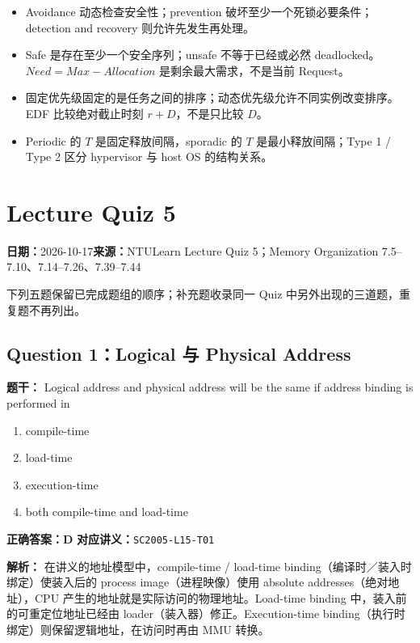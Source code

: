\documentclass[11pt,a4paper,fontset=fandol]{ctexart}
\renewcommand{\exercisequestion}[2]{%
  \Needspace{5\baselineskip}%
  \subsection{#2}\label{exercise:#1}%
}
\renewcommand{\exercisemeta}[5]{%
  {\small\textbf{日期：}#2\quad\textbf{来源：}#3\par}%
}
\renewenvironment{checkedsolution}
  {\par\nopagebreak[4]\textbf{解析：}\ignorespaces}
  {\par}
\begin{document}
\begin{itemize}
  \item Avoidance 动态检查安全性；prevention 破坏至少一个死锁必要条件；detection and recovery 则允许先发生再处理。
  \item Safe 是存在至少一个安全序列；unsafe 不等于已经或必然 deadlocked。$Need=Max-Allocation$ 是剩余最大需求，不是当前 Request。
  \item 固定优先级固定的是任务之间的排序；动态优先级允许不同实例改变排序。EDF 比较绝对截止时刻 $r+D$，不是只比较 $D$。
  \item Periodic 的 $T$ 是固定释放间隔，sporadic 的 $T$ 是最小释放间隔；Type 1 / Type 2 区分 hypervisor 与 host OS 的结构关系。
\end{itemize}

\section{Lecture Quiz 5}
\label{homework:SC2005-HW05}

\exercisemeta
  {SC2005-HW05}
  {2026-10-17}
  {NTULearn Lecture Quiz 5；Memory Organization 7.5--7.10、7.14--7.26、7.39--7.44}
  {五道主问题已完成并根据平台反馈核对；三道补充题按讲义核对}
  {是（2026-10-17）}

下列五题保留已完成题组的顺序；补充题收录同一 Quiz 中另外出现的三道题，重复题不再列出。

\exercisequestion{SC2005-HW05-Q01}{Question 1：Logical 与 Physical Address}

\textbf{题干：} Logical address and physical address will be the same if address binding is performed in

\begin{enumerate}[label=\Alph*.,leftmargin=2.4em]
  \item compile-time
  \item load-time
  \item execution-time
  \item both compile-time and load-time
\end{enumerate}

\textbf{正确答案：D}\qquad
\textbf{对应讲义：}\texttt{SC2005-L15-T01}

\begin{checkedsolution}
在讲义的地址模型中，compile-time / load-time binding（编译时／装入时绑定）使装入后的 process image（进程映像）使用 absolute addresses（绝对地址），CPU 产生的地址就是实际访问的物理地址。Load-time binding 中，装入前的可重定位地址已经由 loader（装入器）修正。Execution-time binding（执行时绑定）则保留逻辑地址，在访问时再由 MMU 转换。
\end{checkedsolution}
\end{document}
